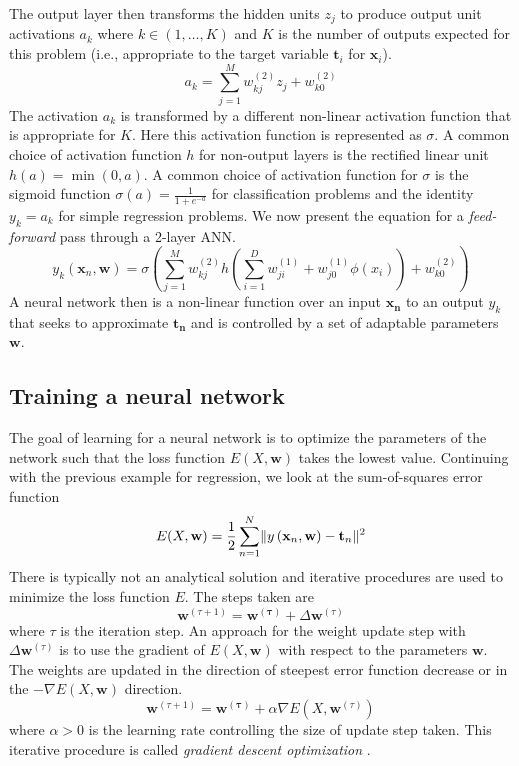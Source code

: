 The output layer then transforms the hidden units $z_j$ to produce output unit activations 
$a_k$ where $k \in (1, \ldots, K)$ and $K$ is the number of outputs expected for this problem
(i.e., appropriate to the target variable $\mathbf{t}_i$ for $\mathbf{x}_i$).
\begin{equation}
     a_k = \sum_{j=1}^{M} w_{kj}^{(2)}z_j + w_{k0}^{(2)} 
\end{equation}
The activation $a_k$ is transformed by a different non-linear activation function that is 
appropriate for $K$. Here this activation function is represented as $\sigma$. A common choice 
of activation function $h$ for non-output layers is the rectified linear unit 
$h(a) = \min(0, a)$. A common choice of activation function for $\sigma$ is the sigmoid 
function $\sigma(a) = \frac{1}{1 + e^{-a}}$ for classification problems and the identity $y_k = a_k$ 
for simple regression problems.
We now present the equation for a \textit{feed-forward} pass through a 2-layer ANN.
\begin{equation}
    y_{k}(\mathbf{x}_n, \mathbf{w}) =  \sigma \left( \sum_{j=1}^{M}  w_{kj}^{(2)}h \left( \sum_{i=1}^{D} w_{ji}^{(1)} + w_{j0}^{(1)} \phi\left(x_i\right)\right) + w_{k0}^{(2)} \right)
\end{equation}
A neural network then is a non-linear function over an input $\mathbf{x_n}$ to an output $y_k$ 
that seeks to approximate $\mathbf{t_n}$ and is controlled by a set of adaptable parameters
$\mathbf{w}$.
\subsection{Training a neural network}
The goal of learning for a neural network is to optimize the parameters of the network such 
that the loss function $E(X, \mathbf{w})$ takes the lowest value. Continuing with the 
previous example for regression, we look at the sum-of-squares error function 
\begin{equation}
    E(X, \mathbf{w}) = \frac{1}{2}\sum_{n=1}^{N} \lVert y\left(\mathbf{x}_n, \mathbf{w}  \right) - \mathbf{t}_n\rVert^2
\end{equation}
There is typically not an analytical solution and iterative procedures are used to 
minimize the loss function $E$. The steps taken are
\begin{equation}
    \mathbf{w}^{(\tau+1)} = \mathbf{w^{(\tau)}} + \Delta \mathbf{w}^{(\tau)}
\end{equation} where $\tau$ is the iteration step. An approach for the weight update step 
with $\Delta \mathbf{w}^{(\tau)}$ is to use the gradient of $E(X, \mathbf{w})$ with 
respect to the parameters $\mathbf{w}$. The weights are updated in the direction of 
steepest error function decrease or in the $- \nabla E(X, \mathbf{w})$ direction.
\begin{equation}
     \mathbf{w}^{(\tau+1)} = \mathbf{w^{(\tau)}} + \alpha \nabla E\left( X, \mathbf{w}^{(\tau)} \right)
\end{equation} where $\alpha > 0$ is the learning rate controlling the size of update step 
taken. This iterative procedure is called \textit{gradient descent optimization} 
\cite{RumHinWil:86}. 
